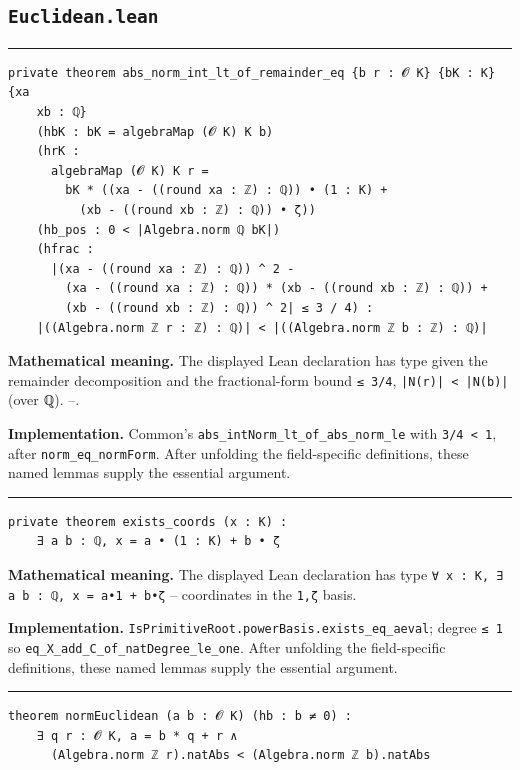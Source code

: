 \documentclass[UTF8,a4paper,11pt,fontset=fandol]{ctexart}
\theoremstyle{definition}
\newcommand{\statementsep}{\par\medskip\hrule\medskip}
\begin{document}
\subsection{\texttt{Euclidean.lean}}

\statementsep
\begin{verbatim}
private theorem abs_norm_int_lt_of_remainder_eq {b r : 𝓞 K} {bK : K} {xa
    xb : ℚ}
    (hbK : bK = algebraMap (𝓞 K) K b)
    (hrK :
      algebraMap (𝓞 K) K r =
        bK * ((xa - ((round xa : ℤ) : ℚ)) • (1 : K) +
          (xb - ((round xb : ℤ) : ℚ)) • ζ))
    (hb_pos : 0 < |Algebra.norm ℚ bK|)
    (hfrac :
      |(xa - ((round xa : ℤ) : ℚ)) ^ 2 -
        (xa - ((round xa : ℤ) : ℚ)) * (xb - ((round xb : ℤ) : ℚ)) +
        (xb - ((round xb : ℤ) : ℚ)) ^ 2| ≤ 3 / 4) :
    |((Algebra.norm ℤ r : ℤ) : ℚ)| < |((Algebra.norm ℤ b : ℤ) : ℚ)|
\end{verbatim}
\noindent\textbf{Mathematical meaning.} The displayed Lean declaration has type given the remainder decomposition and the fractional-form bound \texttt{≤ 3/\allowbreak{}4}, \texttt{|N(r)| < |N(b)|} (over ℚ). --.\par
\noindent\textbf{Implementation.} Common's \texttt{abs\_\allowbreak{}intNorm\_\allowbreak{}lt\_\allowbreak{}of\_\allowbreak{}abs\_\allowbreak{}norm\_\allowbreak{}le} with \texttt{3/\allowbreak{}4 < 1}, after \texttt{norm\_\allowbreak{}eq\_\allowbreak{}normForm}. After unfolding the field-specific definitions, these named lemmas supply the essential argument.\par
\statementsep
\begin{verbatim}
private theorem exists_coords (x : K) :
    ∃ a b : ℚ, x = a • (1 : K) + b • ζ
\end{verbatim}
\noindent\textbf{Mathematical meaning.} The displayed Lean declaration has type \texttt{∀ x : K, ∃ a b : ℚ, x = a•1 + b•ζ} -- coordinates in the \texttt{1,ζ} basis.\par
\noindent\textbf{Implementation.} \texttt{IsPrimitiveRoot.\allowbreak{}powerBasis.\allowbreak{}exists\_\allowbreak{}eq\_\allowbreak{}aeval}; degree \texttt{≤ 1} so \texttt{eq\_\allowbreak{}X\_\allowbreak{}add\_\allowbreak{}C\_\allowbreak{}of\_\allowbreak{}natDegree\_\allowbreak{}le\_\allowbreak{}one}. After unfolding the field-specific definitions, these named lemmas supply the essential argument.\par
\statementsep
\begin{verbatim}
theorem normEuclidean (a b : 𝓞 K) (hb : b ≠ 0) :
    ∃ q r : 𝓞 K, a = b * q + r ∧
      (Algebra.norm ℤ r).natAbs < (Algebra.norm ℤ b).natAbs
\end{verbatim}
\end{document}
